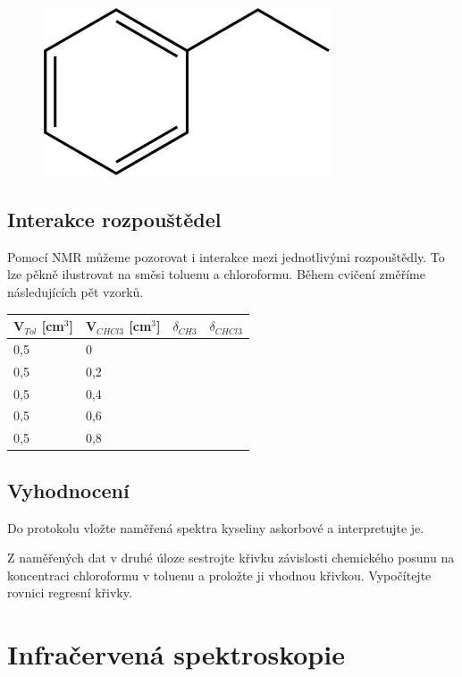 \documentclass[12pt]{article}
\begin{document}
\begin{figure}[h]
	\includegraphics[keepaspectratio,height=5cm]{img/ethylbenzene.png}
\end{figure}
\newpage

\subsection{Interakce rozpouštědel}

Pomocí NMR můžeme pozorovat i interakce mezi jednotlivými rozpouštědly. To lze pěkně ilustrovat na směsi toluenu a chloroformu. Během cvičení změříme následujících pět vzorků.
\\

\begin{tabular}{|l|l|l|l|}
	\hline
	\textbf{V$_{Tol}$ [cm$^3$]} & \textbf{V$_{CHCl3}$ [cm$^3$]} & \textbf{$\delta_{CH3}$}
	& \textbf{$\delta_{CHCl3}$} \\\hline
	0,5 & 0 & & \\\hline
	0,5 & 0,2 & & \\\hline
	0,5 & 0,4 & & \\\hline
	0,5 & 0,6 & & \\\hline
	0,5 & 0,8 & & \\\hline
\end{tabular}

\subsection{Vyhodnocení}

Do protokolu vložte naměřená spektra kyseliny askorbové a interpretujte je.

Z naměřených dat v druhé úloze sestrojte křivku závislosti chemického posunu na koncentraci chloroformu v toluenu a proložte ji vhodnou křivkou. Vypočítejte rovnici regresní křivky.

\pagebreak

\section{Infračervená spektroskopie}
\end{document}
